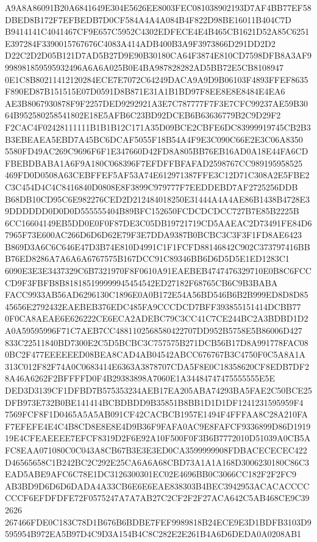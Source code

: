 \documentclass[UTF8,fontset=fandol,zihao=-4,a4paper]{ctexart}
\begin{document}
{{A9A8A86091B20A6841649E304E5626EE8003FEC081038902193D7AF4BB77EF58DBED8B172F7EFBEDB7D0CF584A4A4A084B4F822D98BE16011B404C7D
B9414141C4041467CF9E657C5952C4302EDFECE4E4B465CB1621D52A85C6251E397284F3390015767676C4083A414ADB400B3A9F3973866D291DD2D2
D22C2D2D05B121D7AD5B27D9E90B30180CA64F3874E810CD7598DFB8A3AF9998981859595932496A6A6A025B0E4BA987828282AD5BB72E5CB8108947
0E1C8B80211412120284ECE7E7072C64249DACA9A9D9B06103F4893FFEF8635F890ED87B151515E07D0591D8B871E31A1B1BD97F8EE8E8E8484E4EA6
AE3B8067930878F9F2257DED9292921A3E7C787777F7F3E7CFC99237AE59B3064B952580258541802E18E5AFB6C23BD92DCEB6B63636779B2C9D29F2
F2CAC4F02428111111B1B1B12C171A35D09BCE2CBFE6DC83999919745CB2B3B3EBEAEA5EBD7A45BC6DCAF5055F18B54A4F9E3C090C66E2E3C06A8350
5580FD49AC269C9696F6F1E347660D42FD8A805BB76EB16AD0A18E44FA6CDFBEBDBABA1A6F9A180C068396F7EFDFFBFAFAD2598767CC989195958525
469FD0D0508A63CEBFFEF5AF53A74E612971387FFE3C12D71C308A2E5FBE2C3C454D4C4C8416840D0808E8F3899C979777F7EEDDEBD7AF2725256DDB
B68DB10CD95C6E982276CED2D212484018250E31444A4A4AE86B1438B4728E39DDDDDD0D0D0D555555404B89BFC152650FCDCDCDCC727B7E85B2225B
6CC16604149EB5DD0E0F0F87DE3C05DB19721719CD5AAEAC2D73491FE84D67965F73E600AC266D6D6D62E79F3E7DDA9387B0BCBC3C3F3F1FD8AE6423
B869D3A6C6C646E47D3B74E810D4991C1F1FCFD88146842C902C373797416BBB76ED8286A7A6A6A6767575B167DCC91C89346BB6D6D5D5E1ED1283C1
6090E3E3E3437329C6B7321970F8F0610A91EAEBEB4747476329710E0B8C6FCCCD9F3FBFB8B818185199999945454542ED27182F68765CB6C9B3BABA
FACC9933AB56AD6296130C1896E0A0B172E54A56BD546B6B2B999ED8D8D8545656E2792432EAEBEB376EDC485FA9CCCDCD7BFF393855151414DCBB77
0F0CA8AEAE6E626222CE6ECA2ADEBC79C3CC41C7CE244BC2A3BDBD1D2A0A59595996F71C7AEB7CC4881102568580422707DD952B5758E5B86006D427
833C22511840BD7300E2C5D5BCBC3C757575B271DCB56B17D8A991778FAC080BC2F477EEEEEED08BEA8CAD4AB04542ABCC676767B3C4750F0C5A8A1A
313C012F82F74A0C0683414E6363A3878707CDA5F8E0C18358620CF8EDB7DF28A46A6262F2BFFFFD0F4B29383898A7060E1A34484747475555555E5E
DED3D3139CF1DFBD7B575353234AEB17EA205ABA74293BA5FAE2C50BCE25DFB973E732B0BE141414BCBDBDD9B35851B8BB1D1D1DF1241231595959F4
7569FCF8F1D0465A5A5AB091CF42CACBCB1957E1494F4FFFAA8C28A210FAF7EFEFE4E4C4B8CD8E8E8E4D9B36F9FAFA0AC9E8FAFCF9336899D86D1919
19E4CFEAEEEE7EFCF8319D2F6E92A10F500F0F3B6B7772010D51039A0CB5AFC8EAA071080C0C043A8CB67B3E3E3ED0CA3599999908FDBACECECEC422
D46565658C1B242BC2C292E25CA6A6A68CBD73A1A1A168D3006230180C86C3EAD5ABE9AFC6C78E1DC3126300301EC02E4696BB0C3066CC182F2F2FC9
AB3BD9D6D6D6DADA4A33CB6E6E6EAE838303B4BEC3942953ACACACCCCCCCF6EFDFDFE72F0575247A7A7AB27C2CF2F2F27ACA642C5AB468CE9C392626
267466FDE0C183C78D1B676B6BDBE7FEF9989818B24ECE9E3D1BDFB3103D9595954B972EA5B97D4C9D3A154B4C8C282E2E261B4A6D6DEDA0A0208AB1
}}
\end{document}
